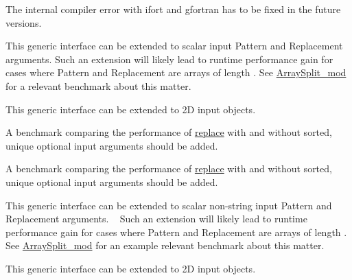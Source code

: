 \begin{DoxyRefList}
\item[Type \mbox{\hyperlink{interfaceArrayReplace__mod_1_1genReplaced}{Array\+Replace\+\_\+mod\+::gen\+Replaced}} ]\label{todo__todo000010}%
%
 The internal compiler error with {\ttfamily ifort} and {\ttfamily gfortran} has to be fixed in the future versions. ~\newline


\label{todo__todo000008}%
%
 This generic interface can be extended to scalar input {\ttfamily Pattern} and {\ttfamily Replacement} arguments. Such an extension will likely lead to runtime performance gain for cases where {\ttfamily Pattern} and {\ttfamily Replacement} are arrays of length {}. See \mbox{\hyperlink{namespaceArraySplit__mod}{Array\+Split\+\_\+mod}} for a relevant benchmark about this matter. ~\newline


\label{todo__todo000007}%
%
 This generic interface can be extended to 2D input objects. ~\newline


\label{todo__todo000009}%
%
 A benchmark comparing the performance of \mbox{\hyperlink{interfaceArrayReplace__mod_1_1replace}{replace}} with and without {\ttfamily sorted, unique} optional input arguments should be added. 
\item[Type \mbox{\hyperlink{interfaceArrayReplace__mod_1_1replace}{Array\+Replace\+\_\+mod\+::replace}} ]\label{todo__todo000013}%
%
 A benchmark comparing the performance of \mbox{\hyperlink{interfaceArrayReplace__mod_1_1replace}{replace}} with and without {\ttfamily sorted, unique} optional input arguments should be added.

\label{todo__todo000012}%
%
 This generic interface can be extended to scalar non-\/string input {\ttfamily Pattern} and {\ttfamily Replacement} arguments. ~\newline
 Such an extension will likely lead to runtime performance gain for cases where {\ttfamily Pattern} and {\ttfamily Replacement} are arrays of length {}. See \mbox{\hyperlink{namespaceArraySplit__mod}{Array\+Split\+\_\+mod}} for an example relevant benchmark about this matter. ~\newline


\label{todo__todo000011}%
%
 This generic interface can be extended to 2D input objects. ~\newline
 

\end{DoxyRefList}
